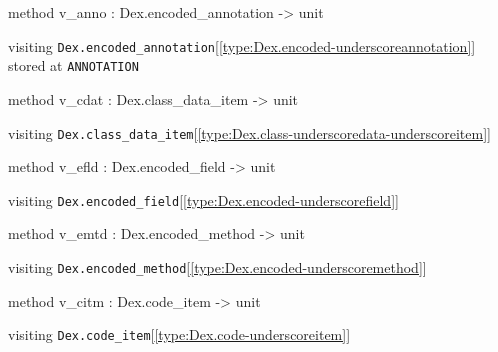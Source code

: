\documentclass[11pt]{article}
\begin{document}
\begin{ocamldocobjectend}
\begin{ocamldocdescription}
\end{ocamldocdescription}


\label{method:Visitor.visitor.v-underscoreanno}\begin{ocamldoccode}
method v_anno : Dex.encoded_annotation -> unit
\end{ocamldoccode}
\begin{ocamldocdescription}
visiting {\tt{Dex.encoded\_annotation}}[\ref{type:Dex.encoded-underscoreannotation}] stored at {\tt{ANNOTATION}}


\end{ocamldocdescription}


\label{method:Visitor.visitor.v-underscorecdat}\begin{ocamldoccode}
method v_cdat : Dex.class_data_item -> unit
\end{ocamldoccode}
\begin{ocamldocdescription}
visiting {\tt{Dex.class\_data\_item}}[\ref{type:Dex.class-underscoredata-underscoreitem}]


\end{ocamldocdescription}


\label{method:Visitor.visitor.v-underscoreefld}\begin{ocamldoccode}
method v_efld : Dex.encoded_field -> unit
\end{ocamldoccode}
\begin{ocamldocdescription}
visiting {\tt{Dex.encoded\_field}}[\ref{type:Dex.encoded-underscorefield}]


\end{ocamldocdescription}


\label{method:Visitor.visitor.v-underscoreemtd}\begin{ocamldoccode}
method v_emtd : Dex.encoded_method -> unit
\end{ocamldoccode}
\begin{ocamldocdescription}
visiting {\tt{Dex.encoded\_method}}[\ref{type:Dex.encoded-underscoremethod}]


\end{ocamldocdescription}


\label{method:Visitor.visitor.v-underscorecitm}\begin{ocamldoccode}
method v_citm : Dex.code_item -> unit
\end{ocamldoccode}
\begin{ocamldocdescription}
visiting {\tt{Dex.code\_item}}[\ref{type:Dex.code-underscoreitem}]



\end{ocamldocdescription}
\end{ocamldocobjectend}
\end{document}
